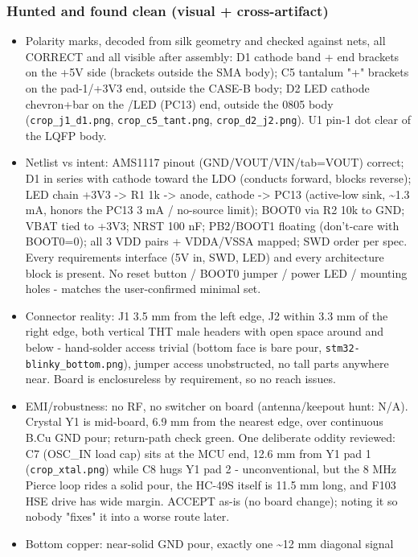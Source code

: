 \documentclass[11pt,a4paper]{article}
\begin{document}
\subsubsection*{Hunted and found clean (visual + cross-artifact)}
\begin{itemize}
\item Polarity marks, decoded from silk geometry and checked against nets, all
CORRECT and all visible after assembly: D1 cathode band + end brackets on
the +5V side (brackets outside the SMA body); C5 tantalum "+" brackets on
the pad-1/+3V3 end, outside the CASE-B body; D2 LED cathode chevron+bar
on the /LED (PC13) end, outside the 0805 body (\texttt{crop\_j1\_d1.png},
\texttt{crop\_c5\_tant.png}, \texttt{crop\_d2\_j2.png}). U1 pin-1 dot clear of the LQFP body.
\item Netlist vs intent: AMS1117 pinout (GND/VOUT/VIN/tab=VOUT) correct; D1 in
series with cathode toward the LDO (conducts forward, blocks reverse);
LED chain +3V3 -\textgreater{} R1 1k -\textgreater{} anode, cathode -\textgreater{} PC13 (active-low sink,
\textasciitilde{}1.3 mA, honors the PC13 3 mA / no-source limit); BOOT0 via R2 10k to
GND; VBAT tied to +3V3; NRST 100 nF; PB2/BOOT1 floating (don't-care with
BOOT0=0); all 3 VDD pairs + VDDA/VSSA mapped; SWD order per spec. Every
requirements interface (5V in, SWD, LED) and every architecture block is
present. No reset button / BOOT0 jumper / power LED / mounting holes -
matches the user-confirmed minimal set.
\item Connector reality: J1 3.5 mm from the left edge, J2 within 3.3 mm of the
right edge, both vertical THT male headers with open space around and
below - hand-solder access trivial (bottom face is bare pour,
\texttt{stm32-blinky\_bottom.png}), jumper access unobstructed, no tall parts
anywhere near. Board is enclosureless by requirement, so no reach issues.
\item EMI/robustness: no RF, no switcher on board (antenna/keepout hunt: N/A).
Crystal Y1 is mid-board, 6.9 mm from the nearest edge, over continuous
B.Cu GND pour; return-path check green. One deliberate oddity reviewed:
C7 (OSC\_IN load cap) sits at the MCU end, 12.6 mm from Y1 pad 1
(\texttt{crop\_xtal.png}) while C8 hugs Y1 pad 2 - unconventional, but the
8 MHz Pierce loop rides a solid pour, the HC-49S itself is 11.5 mm long,
and F103 HSE drive has wide margin. ACCEPT as-is (no board change);
noting it so nobody "fixes" it into a worse route later.
\item Bottom copper: near-solid GND pour, exactly one \textasciitilde{}12 mm diagonal signal

\end{itemize}
\end{document}
